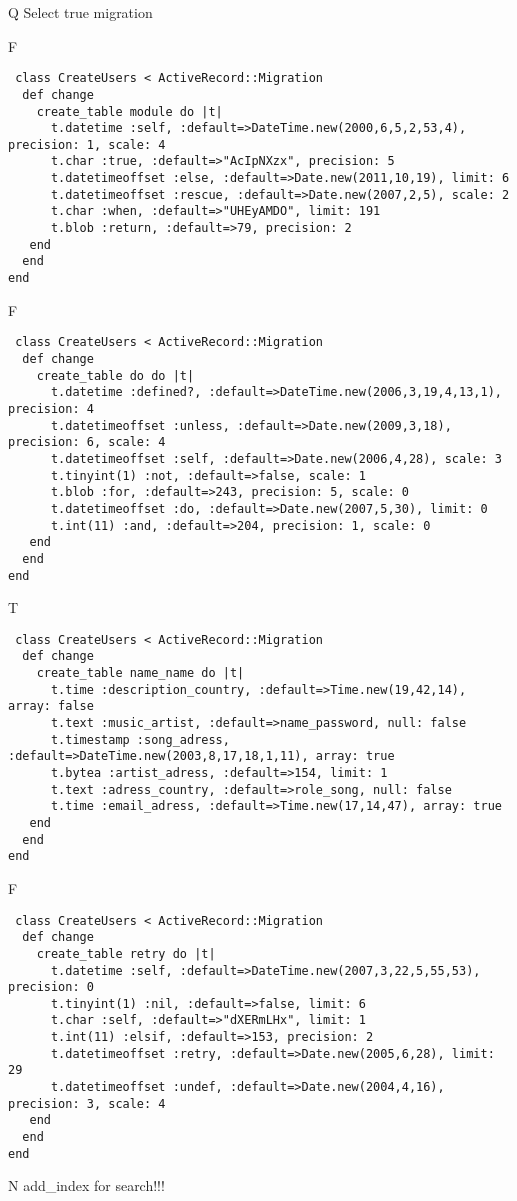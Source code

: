 Q
Select true migration

F
\begin{verbatim}
 class CreateUsers < ActiveRecord::Migration 
  def change 
    create_table module do |t| 
      t.datetime :self, :default=>DateTime.new(2000,6,5,2,53,4), precision: 1, scale: 4
      t.char :true, :default=>"AcIpNXzx", precision: 5
      t.datetimeoffset :else, :default=>Date.new(2011,10,19), limit: 6
      t.datetimeoffset :rescue, :default=>Date.new(2007,2,5), scale: 2
      t.char :when, :default=>"UHEyAMDO", limit: 191
      t.blob :return, :default=>79, precision: 2
   end 
  end 
end
\end{verbatim}

F
\begin{verbatim}
 class CreateUsers < ActiveRecord::Migration 
  def change 
    create_table do do |t| 
      t.datetime :defined?, :default=>DateTime.new(2006,3,19,4,13,1), precision: 4
      t.datetimeoffset :unless, :default=>Date.new(2009,3,18), precision: 6, scale: 4
      t.datetimeoffset :self, :default=>Date.new(2006,4,28), scale: 3
      t.tinyint(1) :not, :default=>false, scale: 1
      t.blob :for, :default=>243, precision: 5, scale: 0
      t.datetimeoffset :do, :default=>Date.new(2007,5,30), limit: 0
      t.int(11) :and, :default=>204, precision: 1, scale: 0
   end 
  end 
end
\end{verbatim}

T
\begin{verbatim}
 class CreateUsers < ActiveRecord::Migration 
  def change 
    create_table name_name do |t| 
      t.time :description_country, :default=>Time.new(19,42,14), array: false
      t.text :music_artist, :default=>name_password, null: false
      t.timestamp :song_adress, :default=>DateTime.new(2003,8,17,18,1,11), array: true
      t.bytea :artist_adress, :default=>154, limit: 1
      t.text :adress_country, :default=>role_song, null: false
      t.time :email_adress, :default=>Time.new(17,14,47), array: true
   end 
  end 
end
\end{verbatim}

F
\begin{verbatim}
 class CreateUsers < ActiveRecord::Migration 
  def change 
    create_table retry do |t| 
      t.datetime :self, :default=>DateTime.new(2007,3,22,5,55,53), precision: 0
      t.tinyint(1) :nil, :default=>false, limit: 6
      t.char :self, :default=>"dXERmLHx", limit: 1
      t.int(11) :elsif, :default=>153, precision: 2
      t.datetimeoffset :retry, :default=>Date.new(2005,6,28), limit: 29
      t.datetimeoffset :undef, :default=>Date.new(2004,4,16), precision: 3, scale: 4
   end 
  end 
end
\end{verbatim}
N
add_index for search!!!
  
